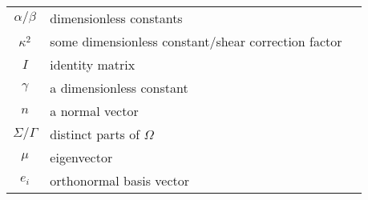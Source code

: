 \documentclass[main.tex]{subfiles}
\begin{document}
\begin{tabularx}{\textwidth}{cXr}
\( \alpha/\beta \) & dimensionless constants & \pageref{sym:alphabeta} \\
\( \kappa^2 \) & some dimensionless constant/shear correction factor & \pageref{sym:kappa2} \\
\( I \) & identity matrix & \pageref{sym:I} \\
\( \gamma \) & a dimensionless constant & \pageref{sym:gamma} \\
\( n \) & a normal vector & \pageref{sym:n} \\
\( \Sigma/\Gamma \) & distinct parts of \( \Omega \) & \pageref{sym:SigmaGamma} \\
\( \mu \) & eigenvector & \pageref{sym:mu} \\
\( e_i \) & orthonormal basis vector & \pageref{sym:e_i} \\

\bottomrule
\end{tabularx}
\end{document}

